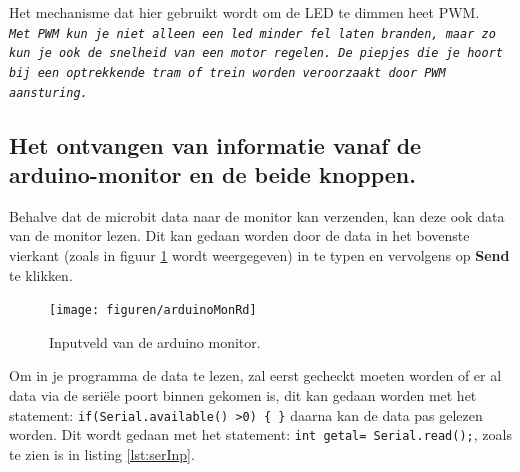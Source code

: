  
 

 Het mechanisme dat hier gebruikt wordt om de LED te dimmen heet PWM.\\
{ \texttt{\textit{Met PWM kun je niet alleen een led minder fel laten branden, maar zo kun je ook de snelheid van een motor regelen. De piepjes die je hoort bij een optrekkende tram of trein worden veroorzaakt door PWM aansturing.}}}
 
 \subsection{Het ontvangen van informatie vanaf de arduino-monitor en de beide knoppen.}
 
 Behalve dat de microbit data naar de monitor kan verzenden, kan deze ook data van de  monitor lezen.
 Dit kan gedaan worden door de data in het bovenste vierkant (zoals in figuur \ref{fig:ardMonRd} wordt weergegeven) in te typen en vervolgens op \textbf{Send} te klikken.
 \begin{figure}[h!]
 	\captionsetup{justification=centering}
 	\texttt{[image: figuren/arduinoMonRd]}
 	\centering
 	\caption{Inputveld van de arduino monitor.}
 	\label{fig:ardMonRd}
 \end{figure}
Om in je programma de data te lezen, zal eerst gecheckt moeten worden of er al data via de seriële poort binnen gekomen is, dit kan gedaan worden met het statement:  \texttt{if(\textcolor{BurntOrange}{Serial.available}() \textgreater 0) \{ \}} daarna kan de data pas gelezen worden. 
Dit wordt gedaan met het statement:   \texttt{int getal=\textcolor{BurntOrange}{ Serial.read}();}, zoals te zien is in listing \ref{lst:serInp}.

